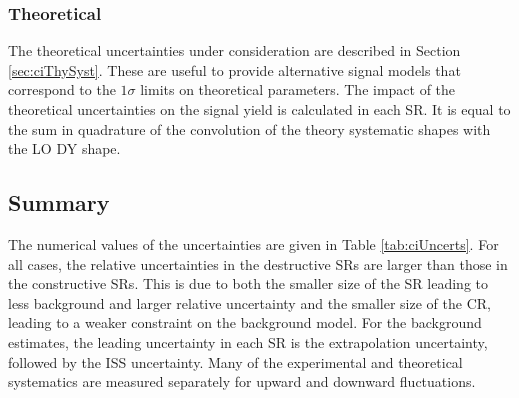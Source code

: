 \subsubsection{Theoretical}\label{sec:ciSigThySyst}
The theoretical uncertainties under consideration are described in Section \ref{sec:ciThySyst}.
These are useful to provide alternative signal models that correspond to the $1\sigma$ limits on theoretical parameters.
The impact of the theoretical uncertainties on the signal yield is calculated in each SR.
It is equal to the sum in quadrature of the convolution of the theory systematic shapes with the LO DY shape.


\subsection{Summary}

The numerical values of the uncertainties are given in Table \ref{tab:ciUncerts}.
For all cases, the relative uncertainties in the destructive SRs are larger than those in the constructive SRs.
This is due to both the smaller size of the SR leading to less background and larger relative uncertainty and the smaller size of the CR, leading to a weaker constraint on the background model.
For the background estimates, the leading uncertainty in each SR is the extrapolation uncertainty, followed by the ISS uncertainty.
Many of the experimental and theoretical systematics are measured separately for upward and downward fluctuations.


